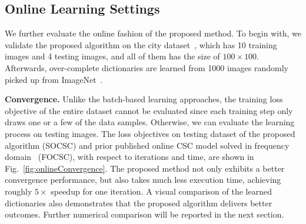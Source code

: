 \subsection{Online Learning Settings}
We further evaluate the online fashion of the proposed method. To begin with, we validate the proposed algorithm on the city dataset~\citep{zeiler2010deconvolutional}, which has 10 training images and 4 testing images, and all of them has the size of $100 \times 100$. Afterwards, over-complete dictionaries are learned from 1000 images randomly picked up from ImageNet~\cite{deng2009imagenet}.

{\bfseries Convergence.} Unlike the batch-based learning approaches, the training loss objective of the entire
dataset cannot be evaluated since each training step only draws one or a few of the data samples. Otherwise, we can evaluate the learning process on testing images. The loss objectives on testing dataset of the proposed algorithm (SOCSC) and prior published online CSC model solved in frequency domain~\citep{liu-2018-first} (FOCSC), with respect to iterations and time, are shown in Fig.~\ref{fig:onlineConvergence}. The proposed method not only exhibits a better convergence performance, but also takes much less execution time, achieving roughly $5 \times$ speedup for one iteration. A visual comparison of the learned dictionaries also demonstrates that the proposed algorithm delivers better outcomes. Further numerical comparison will be reported in the next section.

